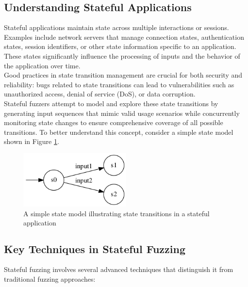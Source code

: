 \subsection{Understanding Stateful Applications}
Stateful applications maintain state across multiple interactions or sessions. Examples include network servers that manage connection states, authentication states, session identifiers, or other state information specific to an application. These states significantly influence the processing of inputs and the behavior of the application over time.
\\Good practices in state transition management are crucial for both security and reliability: bugs related to state transitions can lead to vulnerabilities such as unauthorized access, denial of service (DoS), or data corruption. 
\\Stateful fuzzers attempt to model and explore these state transitions by generating input sequences that mimic valid usage scenarios while concurrently monitoring state changes to ensure comprehensive coverage of all possible transitions. To better understand this concept, consider a simple state model shown in Figure \ref{fig:simplestatemodel}.

\begin{figure}[h]
    \centering
    \includegraphics[width=0.5\textwidth]{Images/simplestatemodel.png}
    \caption{A simple state model illustrating state transitions in a stateful application}
    \label{fig:simplestatemodel}
\end{figure}


\subsection{Key Techniques in Stateful Fuzzing}
Stateful fuzzing involves several advanced techniques that distinguish it from traditional fuzzing approaches:

